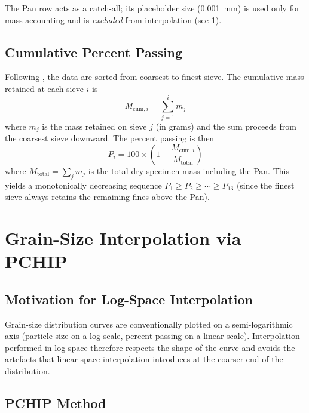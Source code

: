 \documentclass[12pt,a4paper]{article}
\begin{document}
\noindent
The Pan row acts as a catch-all; its placeholder size (\SI{0.001}{\milli\metre})
is used only for mass accounting and is \emph{excluded} from interpolation
(see \cref{sec:pchip}).

\subsection{Cumulative Percent Passing}
\label{sec:percent_passing}

Following \citet{astm_d6913}, the data are sorted from coarsest to finest sieve.
The cumulative mass retained at each sieve $i$ is
\begin{equation}
    M_{\mathrm{cum},i} = \sum_{j=1}^{i} m_j
    \label{eq:cum_retained}
\end{equation}
where $m_j$ is the mass retained on sieve $j$ (in grams) and the sum proceeds
from the coarsest sieve downward.  The percent passing is then
\begin{equation}
    P_i = 100 \times \left(1 - \frac{M_{\mathrm{cum},i}}{M_{\mathrm{total}}}\right)
    \label{eq:percent_passing}
\end{equation}
where $M_{\mathrm{total}} = \sum_j m_j$ is the total dry specimen mass
including the Pan.  This yields a monotonically decreasing sequence
$P_1 \ge P_2 \ge \cdots \ge P_{13}$ (since the finest sieve always retains
the remaining fines above the Pan).

\section{Grain-Size Interpolation via PCHIP}
\label{sec:pchip}

\subsection{Motivation for Log-Space Interpolation}

Grain-size distribution curves are conventionally plotted on a semi-logarithmic
axis (particle size on a log scale, percent passing on a linear scale).
Interpolation performed in log-space therefore respects the shape of the
curve and avoids the artefacts that linear-space interpolation introduces at
the coarser end of the distribution.

\subsection{PCHIP Method}
\end{document}
